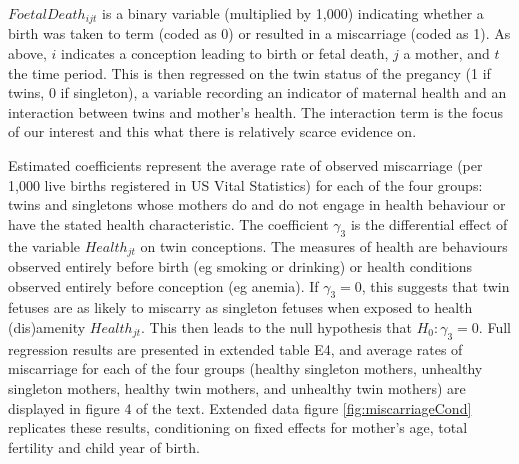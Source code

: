 \documentclass{nature}
\begin{document}
\begin{linenumbers}
$FoetalDeath_{ijt}$ is a binary variable (multiplied by 1,000) indicating whether a birth was taken to term (coded as 0) or resulted in a miscarriage (coded as 1).  As above, $i$ indicates a conception leading to birth or fetal death, $j$ a mother, and $t$ the time period. This is then regressed on the twin status of the pregancy (1 if twins, 0 if singleton), a variable recording an indicator of maternal health and an interaction between twins and mother's health. The interaction term is the focus of our interest and this what there is relatively scarce evidence on. 

Estimated coefficients represent the average rate of observed miscarriage (per 1,000 live births registered in US Vital Statistics) for each of the four groups: twins and singletons whose mothers do and do not engage in health behaviour or have the stated health characteristic. The coefficient $\gamma_3$ is the differential effect of the variable $Health_{jt}$ on twin conceptions. The measures of health are behaviours observed entirely before birth (eg smoking or drinking) or health conditions observed entirely before conception (eg anemia). If $\gamma_3=0$, this suggests that twin fetuses are as likely to miscarry as singleton fetuses when exposed to health (dis)amenity $Health_{jt}$.  This then leads to the null hypothesis that $H_0: \gamma_3=0$. Full regression results are presented in extended table E4, and average rates of miscarriage for each of the four groups (healthy singleton mothers, unhealthy singleton mothers, healthy twin mothers, and unhealthy twin mothers) are displayed in figure 4 of the text. %
Extended data figure \ref{fig:miscarriageCond} replicates these results, conditioning on fixed effects for mother's age, total fertility and child year of birth.


\end{linenumbers}
\end{document}
